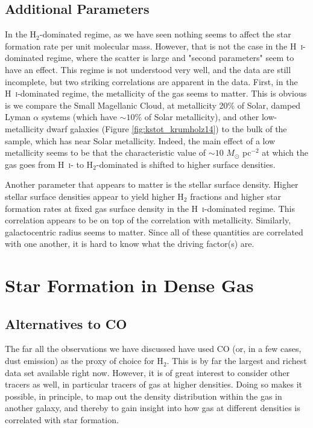 \subsection{Additional Parameters}

In the H$_2$-dominated regime, as we have seen nothing seems to affect the star formation rate per unit molecular mass. However, that is not the case in the H~\textsc{i}-dominated regime, where the scatter is large and "second parameters" seem to have an effect. This regime is not understood very well, and the data are still incomplete, but two striking correlations are apparent in the data. First, in the H~\textsc{i}-dominated regime, the metallicity of the gas seems to matter. This is obvious is we compare the Small Magellanic Cloud, at metallicity 20\% of Solar, damped Lyman $\alpha$ systems (which have $\sim 10\%$ of Solar metallicity), and other low-metallicity dwarf galaxies (Figure \ref{fig:kstot_krumholz14}) to the bulk of the sample, which has near Solar metallicity. Indeed, the main effect of a low metallicity seems to be that the characteristic value of $\sim 10$ $M_\odot$ pc$^{-2}$ at which the gas goes from H~\textsc{i}- to H$_2$-dominated is shifted to higher surface densities.

Another parameter that appears to matter is the stellar surface density. Higher stellar surface densities appear to yield higher H$_2$ fractions and higher star formation rates at fixed gas surface density in the H~\textsc{i}-dominated regime. This correlation appears to be on top of the correlation with metallicity. Similarly, galactocentric radius seems to matter. Since all of these quantities are correlated with one another, it is hard to know what the driving factor(s) are.

\section{Star Formation in Dense Gas}

\subsection{Alternatives to CO}

The far all the observations we have discussed have used CO (or, in a few cases, dust emission) as the proxy of choice for H$_2$. This is by far the largest and richest data set available right now. However, it is of great interest to consider other tracers as well, in particular tracers of gas at higher densities. Doing so makes it possible, in principle, to map out the density distribution within the gas in another galaxy, and thereby to gain insight into how gas at different densities is correlated with star formation.

